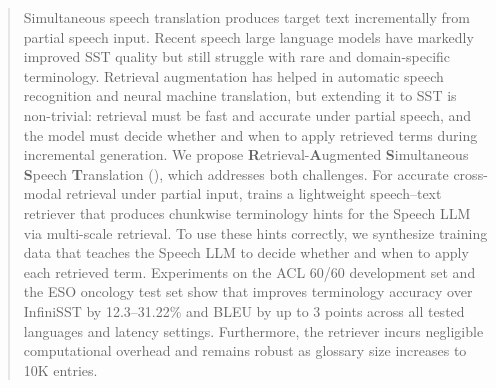 
\begin{abstract}

Simultaneous speech translation produces target text incrementally from partial speech input.
Recent speech large language models have markedly improved SST quality but still struggle with rare and domain-specific terminology. Retrieval augmentation has helped in automatic speech recognition and neural machine translation, but extending it to SST is non-trivial: retrieval must be fast and accurate under partial speech, and the model must decide whether and when to apply retrieved terms during incremental generation.
We propose \textbf{R}etrieval-\textbf{A}ugmented \textbf{S}imultaneous \textbf{S}peech \textbf{T}ranslation (\method), which addresses both challenges. 
For accurate cross-modal retrieval under partial input, \method trains a lightweight speech–text retriever that produces chunkwise terminology hints for the Speech LLM via multi-scale retrieval. To use these hints correctly, we synthesize training data that teaches the Speech LLM to decide whether and when to apply each retrieved term. Experiments on the ACL 60/60 development set and the ESO oncology test set show that \method improves terminology accuracy over InfiniSST by 12.3--31.22\% and BLEU by up to 3 points across all tested languages and latency settings. Furthermore, the retriever incurs negligible computational overhead and remains robust as glossary size increases to 10K entries.

\end{abstract}
